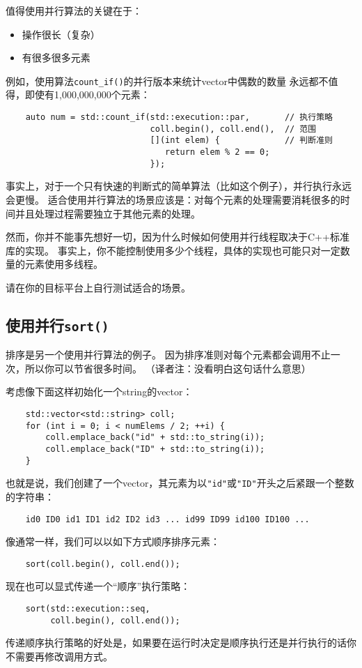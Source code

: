 值得使用并行算法的关键在于：
\begin{itemize}
    \item 操作很长（复杂）
    \item 有很多很多元素
\end{itemize}
例如，使用算法\texttt{count\_if()}的并行版本来统计vector中偶数的数量
永远都不值得，即使有1,000,000,000个元素：
\begin{lstlisting}
    auto num = std::count_if(std::execution::par,       // 执行策略
                             coll.begin(), coll.end(),  // 范围
                             [](int elem) {             // 判断准则
                                return elem % 2 == 0;
                             });
\end{lstlisting}
事实上，对于一个只有快速的判断式的简单算法（比如这个例子），并行执行永远会更慢。
适合使用并行算法的场景应该是：对每个元素的处理需要消耗很多的时间并且处理过程需要独立于其他元素的处理。

然而，你并不能事先想好一切，因为什么时候如何使用并行线程取决于C++标准库的实现。
事实上，你不能控制使用多少个线程，具体的实现也可能只对一定数量的元素使用多线程。

请在你的目标平台上自行测试适合的场景。

\subsection{使用并行\texttt{sort()}}
排序是另一个使用并行算法的例子。
因为排序准则对每个元素都会调用不止一次，所以你可以节省很多时间。
（译者注：没看明白这句话什么意思）

考虑像下面这样初始化一个string的vector：
\begin{lstlisting}
    std::vector<std::string> coll;
    for (int i = 0; i < numElems / 2; ++i) {
        coll.emplace_back("id" + std::to_string(i));
        coll.emplace_back("ID" + std::to_string(i));
    }
\end{lstlisting}
也就是说，我们创建了一个vector，其元素为以\texttt{"id"}或\texttt{"ID"}开头之后紧跟一个整数的字符串：
\begin{lstlisting}
    id0 ID0 id1 ID1 id2 ID2 id3 ... id99 ID99 id100 ID100 ...
\end{lstlisting}
像通常一样，我们可以以如下方式顺序排序元素：
\begin{lstlisting}
    sort(coll.begin(), coll.end());
\end{lstlisting}
现在也可以显式传递一个“顺序”执行策略：
\begin{lstlisting}
    sort(std::execution::seq,
         coll.begin(), coll.end());
\end{lstlisting}
传递顺序执行策略的好处是，如果要在运行时决定是顺序执行还是并行执行的话你不需要再修改调用方式。

